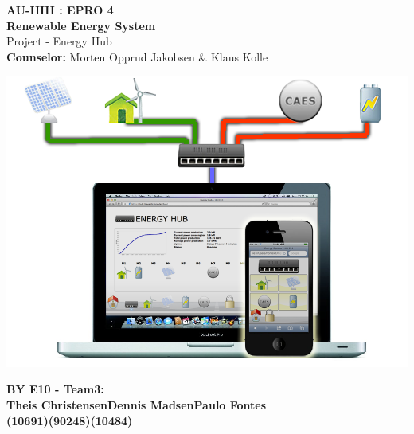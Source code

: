 \begin{centering}
\thispagestyle{empty} %
\begin{center}
\textbf{\Huge {AU-HIH : EPRO 4\\[0.1cm]Renewable Energy System}}\\
\huge {Project - Energy Hub}\\ \vspace{0.4cm}
\large{\textbf{Counselor:} Morten Opprud Jakobsen \& Klaus Kolle}\\ \vspace{0.0cm}
\end{center}

\centering
\includegraphics[width=1\textwidth]{images/frontpage.jpg}
 \end{centering}
 
 
\begin{center}
\vspace{0.4cm}
\Large{\textbf{BY E10 - Team3: \\ \vspace{0.2cm}Theis Christensen\hspace{1.5cm}Dennis Madsen\hspace{1.5cm}Paulo Fontes}
\\\textbf{(10691)\hspace{3.7cm}(90248)\hspace{3.7cm}(10484)}}
\end{center}

\newpage
\thispagestyle{empty}
\mbox{}